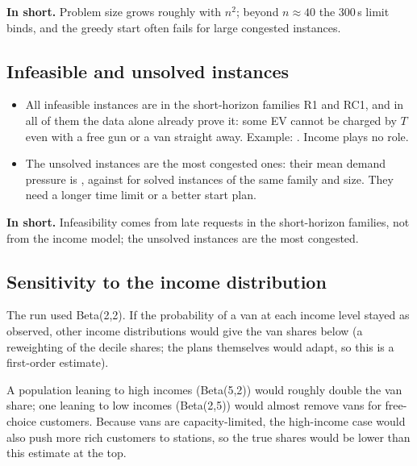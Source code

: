 \documentclass[11pt,a4paper]{article}
\newcommand{\inshort}[1]{\begin{insum}\textbf{In short.} #1\end{insum}}
\begin{document}
\inshort{Problem size grows roughly with $n^2$; beyond $n\approx40$ the 300\,s limit binds, and the greedy start often fails for large congested instances.}

\subsection{Infeasible and unsolved instances}
\label{sec:infeasible}
\begin{table}[H]
\centering\small
\caption{Infeasible instances (Gurobi's verdict).}
\label{tab:infeasible}

\end{table}
\begin{itemize}
  \item All \InfTotal{} infeasible instances are in the short-horizon families R1 and RC1, and in all \InfProven{} of them the data alone already prove it: some EV cannot be charged by $T$ even with a free gun or a van straight away. Example: \LateExample. Income plays no role.
  \item The \NNone{} unsolved instances are the most congested ones: their mean demand pressure is \UnsolvedPress, against \SolvedPressSame{} for solved instances of the same family and size. They need a longer time limit or a better start plan.
\end{itemize}

\inshort{Infeasibility comes from late requests in the short-horizon families, not from the income model; the unsolved instances are the most congested.}

\subsection{Sensitivity to the income distribution}
\label{sec:beta}
The run used Beta(2,2). If the probability of a van at each income level stayed as observed, other income distributions would give the van shares below (a reweighting of the decile shares; the plans themselves would adapt, so this is a first-order estimate).
\begin{table}[H]
\centering\small
\caption{Expected van share of free-choice EVs under other income distributions.}
\label{tab:beta}

\end{table}
A population leaning to high incomes (Beta(5,2)) would roughly double the van share; one leaning to low incomes (Beta(2,5)) would almost remove vans for free-choice customers. Because vans are capacity-limited, the high-income case would also push more rich customers to stations, so the true shares would be lower than this estimate at the top.
\end{document}
